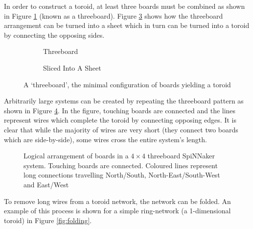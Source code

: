 			In order to construct a toroid, at least three boards  must be combined as
			shown in Figure \ref{fig:threeboard} (known as a threeboard).  Figure
			\ref{fig:threeboardSliced} shows how the threeboard arrangement can be
			turned into a sheet which in turn can be turned into a toroid by connecting
			the opposing sides.
			
			\begin{figure}
				\begin{subfigure}[b]{0.45\textwidth}
					\center
					
					\caption{Threeboard}
					\label{fig:threeboard}
				\end{subfigure}
				\begin{subfigure}[b]{0.45\textwidth}
					\center
					
					\caption{Sliced Into A Sheet}
					\label{fig:threeboardSliced}
				\end{subfigure}
				
				\caption[A `threeboard']{A `threeboard', the minimal configuration of boards yielding a
				toroid}
			\end{figure}
			
			Arbitrarily large systems can be created by repeating the threeboard
			pattern as shown in Figure \ref{fig:boardsLogical}. In the figure,
			touching boards are connected and the lines represent wires which complete
			the toroid by connecting opposing edges. It is clear that while the
			majority of wires are very short (they connect two boards which are
			side-by-side), some wires cross the entire system's length.
			
			\begin{figure}
				\center
				
				\caption[Logical arrangement of boards in a $4\times4$ threeboard
				SpiNNaker system.]{Logical arrangement of boards in a $4\times4$
				threeboard SpiNNaker system. Touching boards are connected. Coloured
				lines represent long connections travelling {\color{red}North/South},
				{\color{green}North-East/South-West} and {\color{blue}East/West}}
				\label{fig:boardsLogical}
			\end{figure}
			
			To remove long wires from a toroid network, the network can be folded. An
			example of this process is shown for a simple ring-network (a
			1-dimensional toroid) in Figure \ref{fig:folding}.
			
